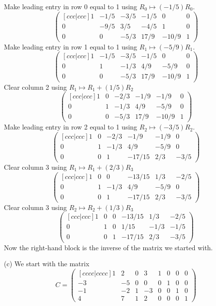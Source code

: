 \documentclass{article}
\begin{document}
Make leading entry in row 0 equal to 1 using
\(R_0\mapsto (-1/5)R_0\). \[\begin{pmatrix}[ c c c | c c c ] 1 & -1/5
& -3/5 & -1/5 & 0 & 0 \\ 0 & -9/5 & 3/5 & -4/5 & 1 & 0 \\ 0 & 0 & -5/3
& 17/9 & -10/9 & 1 \end{pmatrix}\]Make leading entry in row 1 equal to
1 using \(R_1\mapsto (-5/9)R_1\). \[\begin{pmatrix}[ c c c | c c c ]
1 & -1/5 & -3/5 & -1/5 & 0 & 0 \\ 0 & 1 & -1/3 & 4/9 & -5/9 & 0 \\ 0 &
0 & -5/3 & 17/9 & -10/9 & 1 \end{pmatrix}\]Clear column 2 using
\(R_1\mapsto R_1+(1/5)R_2\)\[\begin{pmatrix}[ c c c | c c c ] 1 & 0 &
-2/3 & -1/9 & -1/9 & 0 \\ 0 & 1 & -1/3 & 4/9 & -5/9 & 0 \\ 0 & 0 &
-5/3 & 17/9 & -10/9 & 1 \end{pmatrix}\]Make leading entry in row 2
equal to 1 using \(R_2\mapsto (-3/5)R_2\). \[\begin{pmatrix}[ c c c |
c c c ] 1 & 0 & -2/3 & -1/9 & -1/9 & 0 \\ 0 & 1 & -1/3 & 4/9 & -5/9 &
0 \\ 0 & 0 & 1 & -17/15 & 2/3 & -3/5 \end{pmatrix}\]Clear column 3
using \(R_1\mapsto R_1+(2/3)R_3\)\[\begin{pmatrix}[ c c c | c c c ] 1
& 0 & 0 & -13/15 & 1/3 & -2/5 \\ 0 & 1 & -1/3 & 4/9 & -5/9 & 0 \\ 0 &
0 & 1 & -17/15 & 2/3 & -3/5 \end{pmatrix}\]Clear column 3 using
\(R_2\mapsto R_2+(1/3)R_3\)\[\begin{pmatrix}[ c c c | c c c ] 1 & 0 &
0 & -13/15 & 1/3 & -2/5 \\ 0 & 1 & 0 & 1/15 & -1/3 & -1/5 \\ 0 & 0 & 1
& -17/15 & 2/3 & -3/5 \end{pmatrix}\]Now the right-hand block is the
inverse of the matrix we started with.


\newpage


(c) We start with the matrix \[C=\begin{pmatrix}[ c c c c | c c c c ]
1 & 2 & 0 & 3 & 1 & 0 & 0 & 0 \\ -3 & -5 & 0 & 0 & 0 & 1 & 0 & 0 \\ -1
& -2 & 1 & -3 & 0 & 0 & 1 & 0 \\ 4 & 7 & 1 & 2 & 0 & 0 & 0 & 1
\end{pmatrix}\]
\end{document}
